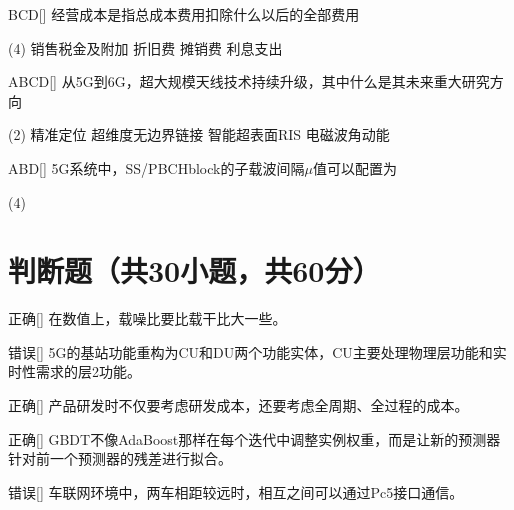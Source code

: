 \begin{choice}{\;BCD\;}[]
    经营成本是指总成本费用扣除什么以后的全部费用
    \begin{tasks}(4)
        \task 销售税金及附加
        \task 折旧费
        \task 摊销费
        \task 利息支出
    \end{tasks}
\end{choice}


\begin{choice}{\;ABCD\;}[]
    从5G到6G，超大规模天线技术持续升级，其中什么是其未来重大研究方向
    \begin{tasks}(2)
        \task 精准定位
        \task 超维度无边界链接
        \task 智能超表面RIS
        \task 电磁波角动能
    \end{tasks}
\end{choice}


\begin{choice}{\;ABD\;}[]
    5G系统中，SS/PBCH\;block的子载波间隔$\mu $值可以配置为
    \begin{tasks}(4)
    \end{tasks}
\end{choice}


\section{判断题（共30小题，共60分）}

\begin{choice}{\;正确\;}[]
    在数值上，载噪比要比载干比大一些。
\end{choice}


\begin{choice}{\;错误\;}[]
    5G的基站功能重构为CU和DU两个功能实体，CU主要处理物理层功能和实时性需求的层2功能。
\end{choice}

\begin{choice}{\;正确\;}[]
    产品研发时不仅要考虑研发成本，还要考虑全周期、全过程的成本。
\end{choice}

\begin{choice}{\;正确\;}[]
    GBDT不像AdaBoost那样在每个迭代中调整实例权重，而是让新的预测器针对前一个预测器的残差进行拟合。
\end{choice}

\begin{choice}{\;错误\;}[]
    车联网环境中，两车相距较远时，相互之间可以通过Pc5接口通信。
\end{choice}

